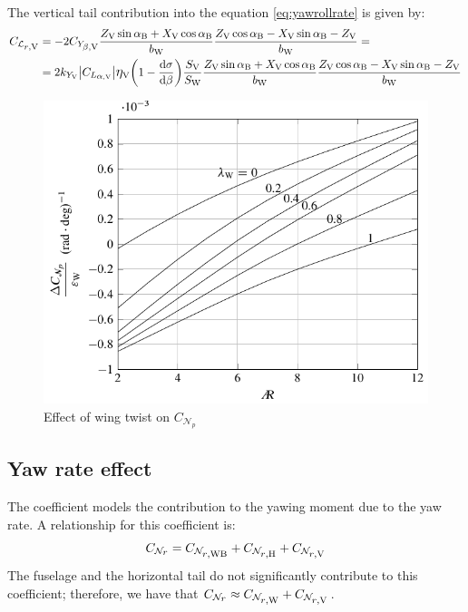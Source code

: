 The vertical tail contribution into the equation \ref{eq:yawrollrate} is given by:
\begin{equation}
\label{eq:rollyawrateV}
\begin{split}
\CLrrateV & = -2 \CYbetaV \frac{\ZV\sin\alphaB + \XV \cos\alphaB}{\bW} \frac{\ZV \cos\alphaB - \XV\sin\alphaB - \ZV}{\bW} = \\
& = 2 k_{Y_\textrm V} \big|\CLalphaV \big| \etaV \biggl( 1 - \frac{\mathrm{d}\sigma}{\mathrm{d}\beta} \biggr) \frac{\SV}{\SW} \frac{\ZV\sin\alphaB + \XV \cos\alphaB}{\bW} \frac{\ZV \cos\alphaB - \XV\sin\alphaB - \ZV}{\bW}
\end{split}
\end{equation}

\begin{figure}[htbp]
\centering
\includegraphics[width=.75\textwidth]{Immagini/Capitolo2/4_83-WingTwist_Unsteady}
\caption[Effect of wing twist on $C_{\mathcal N_\mathrm p}$] {Effect of wing twist on $C_{\mathcal N_p}$}
\label{effectwingtwist}
\end{figure}

\subsection{Yaw rate effect}
\label{subsec2.6.2}

The coefficient \CNrrate models the contribution to the yawing moment due to the yaw rate. A relationship for this coefficient is:
\begin{equation}
\label{eq:yawyawrate}
\CNrrate = \CNrrateWB + \CNrrateH + \CNrrateV
\end{equation}
The fuselage and the horizontal tail do not significantly contribute to this coefficient; therefore, we have that $\CNrrate \approx \CNrrateW + \CNrrateV$.

